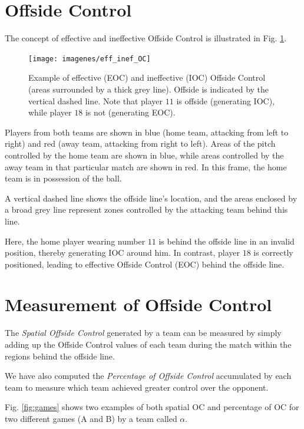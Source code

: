 \documentclass[
  10pt,
  twoside,nohyper]{book}
\begin{document}
\section{Offside Control}\label{offside-control}

The concept of effective and ineffective Offside Control is illustrated in Fig. \ref{fig:eff}.

\begin{figure}[H]

{\centering \texttt{[image: imagenes/eff\_inef\_OC]} 

}

\caption{Example of effective (EOC) and ineffective (IOC) Offside Control (areas surrounded by a thick grey line). Offside is indicated by the vertical dashed line. Note that player $11$ is offside (generating IOC), while player $18$ is not (generating EOC).}\label{fig:eff}
\end{figure}

Players from both teams are shown in blue (home team, attacking from left to right) and red (away team, attacking from right to left). Areas of the pitch controlled by the home team are shown in blue, while areas controlled by the away team in that particular match are shown in red. In this frame, the home team is in possession of the ball.

A vertical dashed line shows the offside line's location, and the areas enclosed by a broad grey line represent zones controlled by the attacking team behind this line.

Here, the home player wearing number \(11\) is behind the offside line in an invalid position, thereby generating IOC around him. In contrast, player \(18\) is correctly positioned, leading to effective Offside Control (EOC) behind the offside line.

\section{Measurement of Offside Control}\label{measurement-of-offside-control}

The \emph{Spatial Offside Control} generated by a team can be measured by simply adding up the Offside Control values of each team during the match within the regions behind the offside line.

We have also computed the \emph{Percentage of Offside Control} accumulated by each team to measure which team achieved greater control over the opponent.

Fig. \ref{fig:games} shows two examples of both spatial OC and percentage of OC for two different games (A and B) by a team called \(\alpha\).
\end{document}
